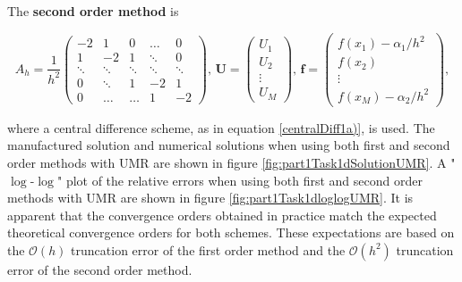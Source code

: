 The \textbf{second order method} is 

\begin{equation*}
    A_h = \frac{1}{h^2}\begin{pmatrix} 
    -2 & 1 & 0 & \dots & 0 \\
    1 & -2 & 1 & \ddots & 0 \\
    \ddots & \ddots & \ddots & \ddots & \ddots \\
    0 & \ddots & 1 & -2 & 1 \\
    0 & \dots & \dots & 1 & -2
    \end{pmatrix}, \, 
    \boldsymbol{U} = \begin{pmatrix}
    U_1 \\
    U_2 \\
    \vdots \\
    U_M 
    \end{pmatrix}, \, \boldsymbol{f} = \begin{pmatrix}
    f(x_1) - \alpha_1/h^2 \\
    f(x_2) \\
    \vdots \\
    f(x_M) - \alpha_2/h^2
    \end{pmatrix},
\end{equation*}

\noindent where a central difference scheme, as in equation \eqref{centralDiff1a)}, is used. The manufactured solution and numerical solutions when using both first and second order methods with UMR are shown in figure \ref{fig:part1Task1dSolutionUMR}. A "$\log$-$\log$" plot of the relative errors when using both first and second order methods with UMR are shown in figure \ref{fig:part1Task1dloglogUMR}. It is apparent that the convergence orders obtained in practice match the expected theoretical convergence orders for both schemes. These expectations are based on the $\mathcal{O}(h)$ truncation error of the first order method and the $\mathcal{O}(h^2)$ truncation error of the second order method.\newline


